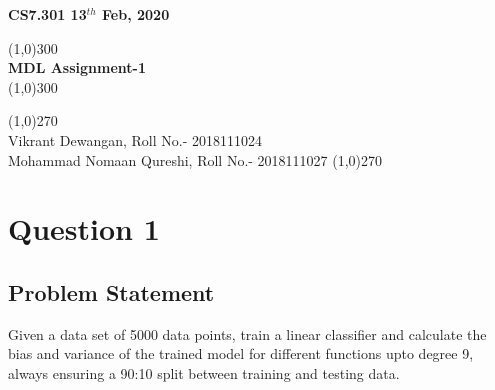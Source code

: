 \documentclass[11pt]{article}
\begin{document}
	\begin{titlepage}
		\begin{flushleft}
			
			\bf CS7.301
			\hfill
			\bfseries 13$^{th}$ Feb, 2020
		\end{flushleft}
		\begin{center}
			\line(1,0){300}\\
			[5mm]
			\huge{\bfseries MDL Assignment-1}\\
			\line(1,0){300}\\
			[12cm]
		\end{center}
		\begin{flushright}
			{
				\line(1,0){270}\\
				\large  Vikrant Dewangan, Roll No.- 2018111024\\  Mohammad Nomaan Qureshi,
				Roll No.- 2018111027
				\line(1,0){270}\\
			}
		\end{flushright}
	\end{titlepage}
	\newpage
	\tableofcontents
	\newpage
	
	\section{Question 1}
	\subsection{Problem Statement}
	Given a data set of 5000 data points, train a linear classifier and calculate
	the bias and variance of the trained model for different functions upto degree
	9, always ensuring a 90:10 split between training and testing data. 
\end{document}
